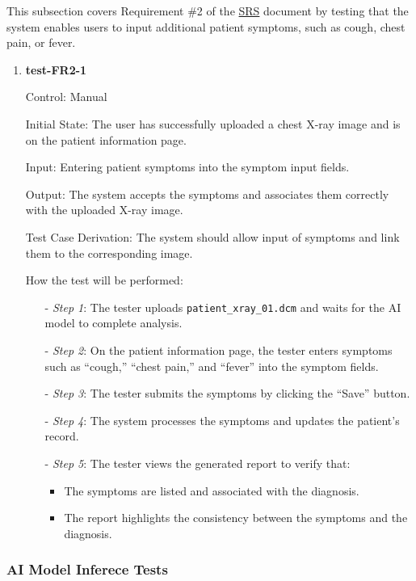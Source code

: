 \documentclass[12pt, titlepage]{article}
\begin{document}
This subsection covers Requirement \#2 of the \href{https://github.com/RezaJodeiri/CXR-Capstone/blob/main/docs/SRS/SRS.pdf}{SRS} \citep{SRS}
document by testing that the system enables users to input additional patient symptoms, such as cough, chest pain, or fever.

\begin{enumerate}

\item \textbf{test-FR2-1} \label{test-FR2-1}

Control: Manual

Initial State: The user has successfully uploaded a chest X-ray image and is on the patient information page.

Input: Entering patient symptoms into the symptom input fields.

Output: The system accepts the symptoms and associates them correctly with the uploaded X-ray image.

Test Case Derivation: The system should allow input of symptoms and link them to the corresponding image.

How the test will be performed: 
\begin{itemize}
  \item[-] \textit{Step 1}: The tester uploads \texttt{patient\_xray\_01.dcm} and waits for the AI model to complete analysis.
  \item[-] \textit{Step 2}: On the patient information page, the tester enters symptoms such as  ``cough,'' ``chest pain,'' and ``fever'' into the symptom fields.
  \item[-] \textit{Step 3}: The tester submits the symptoms by clicking the ``Save'' button.
  \item[-] \textit{Step 4}: The system processes the symptoms and updates the patient's record.
  \item[-] \textit{Step 5}: The tester views the generated report to verify that:
    \begin{itemize}
      \item The symptoms are listed and associated with the diagnosis.
      \item The report highlights the consistency between the symptoms and the diagnosis.
    \end{itemize}
  \end{itemize}

\end{enumerate}

\subsubsection{AI Model Inferece Tests}
\end{document}
